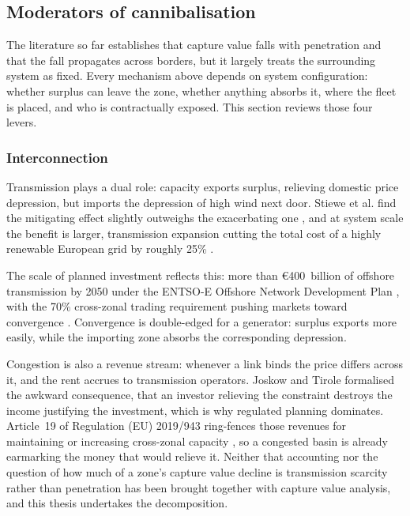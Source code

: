 \subsection{Moderators of cannibalisation}\label{sec:mitigation}

The literature so far establishes that capture value falls with penetration
and that the fall propagates across borders, but it largely treats the
surrounding system as fixed. Every mechanism above depends on system
configuration: whether surplus can leave the zone, whether anything absorbs
it, where the fleet is placed, and who is contractually exposed. This section
reviews those four levers.

\subsubsection{Interconnection}

Transmission plays a dual role: capacity exports surplus, relieving domestic
price depression, but imports the depression of high wind next door. Stiewe
et al. find the mitigating effect slightly outweighs the exacerbating one
\cite{Stiewe2025}, and at system scale the benefit is larger, transmission
expansion cutting the total cost of a highly renewable European grid by
roughly 25\% \cite{Schlachtberger2017}.

The scale of planned investment reflects this: more than \euro{}400~billion
of offshore transmission by 2050 under the ENTSO-E Offshore Network
Development Plan \cite{ONDP2024}, with the 70\% cross-zonal trading
requirement pushing markets toward convergence \cite{ACER2023, ACER2025}.
Convergence is double-edged for a generator: surplus exports more easily,
while the importing zone absorbs the corresponding depression.

Congestion is also a revenue stream: whenever a link binds the price differs
across it, and the rent accrues to transmission operators. Joskow and Tirole
\cite{JoskowTirole2005} formalised the awkward consequence, that an investor
relieving the constraint destroys the income justifying the investment, which is
why regulated planning dominates. Article~19 of Regulation (EU) 2019/943
ring-fences those revenues for maintaining or increasing cross-zonal capacity
\cite{EURegulation2019943}, so a congested basin is already earmarking the money
that would relieve it. Neither that accounting nor the question of how much of a
zone's capture value decline is transmission scarcity rather than penetration
has been brought together with capture value analysis, and this thesis
undertakes the decomposition.

